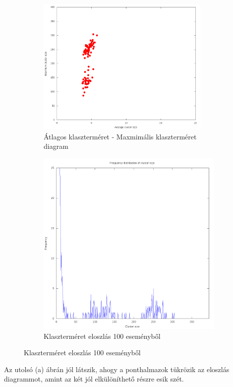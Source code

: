 \documentclass[a4paper,12pt]{article}
\begin{document}
\begin{figure}[H]
	\centering
	\begin{subfigure}{.49\textwidth}
		\includegraphics[width=0.92\textwidth]{mean-max18_120.png}
		\caption{ Átlagos klaszterméret - Maxmimális klaszterméret diagram }
	\end{subfigure}
	\begin{subfigure}{.49\textwidth}
		\includegraphics[width=.92\textwidth]{distribution_zoomed_18_120.png}
		\caption{ Klaszterméret eloszlás 100 eseményből } 
	\end{subfigure}
\end{figure}
\par Az utolsó (a) ábrán jól látszik, ahogy a ponthalmazok tükrözik az eloszlás diagrammot, amint az két jól elkülöníthető részre esik szét.
\end{document}
